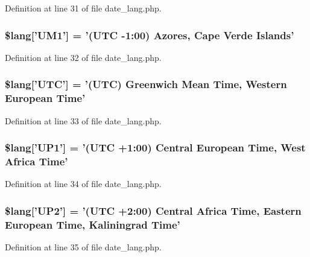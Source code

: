 Definition at line 31 of file date\-\_\-lang.\-php.

\subsubsection[{\$lang}]{\setlength{\rightskip}{0pt plus 5cm}\$lang['U\-M1'] = '(U\-T\-C -\/1\-:00) Azores, Cape Verde Islands'}\label{date__lang_8php_a036e0074236b996b33231b051eda2973}


Definition at line 32 of file date\-\_\-lang.\-php.

\subsubsection[{\$lang}]{\setlength{\rightskip}{0pt plus 5cm}\$lang['U\-T\-C'] = '(U\-T\-C) Greenwich Mean Time, Western European Time'}\label{date__lang_8php_ab153b3219e74743184b7dee67e86f9fc}


Definition at line 33 of file date\-\_\-lang.\-php.

\subsubsection[{\$lang}]{\setlength{\rightskip}{0pt plus 5cm}\$lang['U\-P1'] = '(U\-T\-C +1\-:00) Central European Time, West Africa Time'}\label{date__lang_8php_a788996558e6c8cafd788a1fef6b0be4e}


Definition at line 34 of file date\-\_\-lang.\-php.

\subsubsection[{\$lang}]{\setlength{\rightskip}{0pt plus 5cm}\$lang['U\-P2'] = '(U\-T\-C +2\-:00) Central Africa Time, Eastern European Time, Kaliningrad Time'}\label{date__lang_8php_adfeba045961d07f8f30c0f1a7b8b4ff9}


Definition at line 35 of file date\-\_\-lang.\-php.

